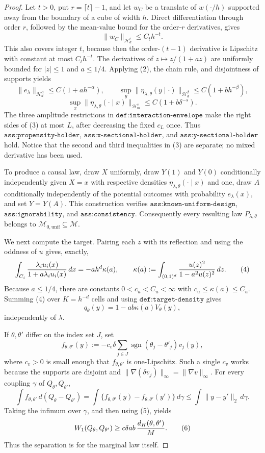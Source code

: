 \documentclass{article}
\begin{document}
\begin{proof}
Let \(t>0\), put \(r=\lceil t\rceil-1\), and let \(w_C\) be a translate of \(w(\cdot/h)\) supported away from the boundary of a cube of width \(h\).  Direct differentiation through order \(r\), followed by the mean-value bound for the order-\(r\) derivatives, gives
\[
 \lVert w_C\rVert_{\mathcal H_d^t}\leq C_t h^{-t}.
 \tag{2}
\]
This also covers integer \(t\), because then the order-\((t-1)\) derivative is Lipschitz with constant at most \(C_t h^{-t}\).  The derivatives of \(z\mapsto z/(1+az)\) are uniformly bounded for \(|z|\leq1\) and \(a\leq1/4\).  Applying (2), the chain rule, and disjointness of supports yields
\[
 \lVert e_\lambda\rVert_{\mathcal H_d^\alpha}
 \leq C(1+ah^{-\alpha}),\qquad
 \sup_y\lVert\eta_{\lambda,\theta}(y\mid\cdot)\rVert_{\mathcal H_d^\beta}
 \leq C(1+bh^{-\beta}),
\]
\[
 \sup_x\lVert\eta_{\lambda,\theta}(\cdot\mid x)\rVert_{\mathcal H_m^s}
 \leq C(1+b\delta^{-s}).
 \tag{3}
\]
The three amplitude restrictions in \(\texttt{def:interaction-envelope}\) make the right sides of (3) at most \(L\), after decreasing the fixed \(c_L\) once.  Thus \(\texttt{ass:propensity-holder}\), \(\texttt{ass:x-sectional-holder}\), and \(\texttt{ass:y-sectional-holder}\) hold.  Notice that the second and third inequalities in (3) are separate; no mixed derivative has been used.

To produce a causal law, draw \(X\) uniformly, draw \(Y(1)\) and \(Y(0)\) conditionally independently given \(X=x\) with respective densities \(\eta_{\lambda,\theta}(\cdot\mid x)\) and one, draw \(A\) conditionally independently of the potential outcomes with probability \(e_\lambda(x)\), and set \(Y=Y(A)\).  This construction verifies \(\texttt{ass:known-uniform-design}\), \(\texttt{ass:ignorability}\), and \(\texttt{ass:consistency}\).  Consequently every resulting law \(P_{\lambda,\theta}\) belongs to \(\mathcal M_{0,\mathrm{unif}}\subseteq\mathcal M\).

We next compute the target.  Pairing each \(z\) with its reflection and using the oddness of \(u\) gives, exactly,
\[
 \int_{C_i}{\lambda_i u_i(x)\over1+a\lambda_i u_i(x)}\,dx
 =-ah^d\kappa(a),\qquad
 \kappa(a):=\int_{(0,1)^d}{u(z)^2\over1-a^2u(z)^2}\,dz.
 \tag{4}
\]
Because \(a\leq1/4\), there are constants \(0<c_u<C_u<\infty\) with \(c_u\leq\kappa(a)\leq C_u\).  Summing (4) over \(K=h^{-d}\) cells and using \(\texttt{def:target-density}\) gives
\[
 q_\theta(y)=1-ab\kappa(a)V_\theta(y),
 \tag{5}
\]
independently of \(\lambda\).

If \(\theta,\theta'\) differ on the index set \(J\), set
\[
 f_{\theta,\theta'}(y)
 :=-c_v\delta\sum_{j\in J}
       \operatorname{sgn}(\theta_j-\theta'_j)v_j(y),
\]
where \(c_v>0\) is small enough that \(f_{\theta,\theta'}\) is one-Lipschitz.  Such a single \(c_v\) works because the supports are disjoint and \(\lVert\nabla(\delta v_j)\rVert_\infty=\lVert\nabla v\rVert_\infty\).  For every coupling \(\gamma\) of \(Q_\theta,Q_{\theta'}\),
\[
 \int f_{\theta,\theta'}\,d(Q_\theta-Q_{\theta'})
 =\int\{f_{\theta,\theta'}(y)-f_{\theta,\theta'}(y')\}\,d\gamma
 \leq\int\lVert y-y'\rVert_2\,d\gamma.
\]
Taking the infimum over \(\gamma\), and then using (5), yields
\[
 W_1(Q_\theta,Q_{\theta'})
 \geq c\delta ab\,{d_H(\theta,\theta')\over M}.
 \tag{6}
\]
Thus the separation is for the marginal law itself.


\end{proof}
\end{document}

